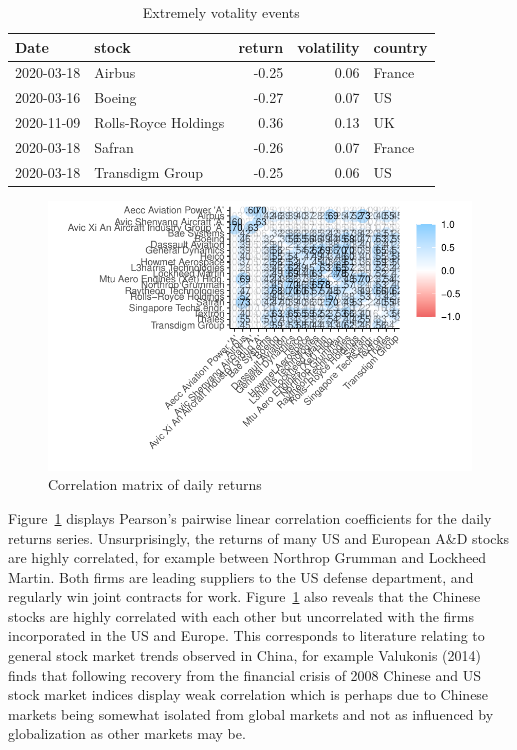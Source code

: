 \documentclass[
  letterpaper,
  DIV=11,
  numbers=noendperiod]{scrartcl}
\begin{document}
\hypertarget{tbl-Xtremes}{}
\begin{table}[H]
\caption{\label{tbl-Xtremes}Extremely votality events }\tabularnewline

\centering
\begin{tabular}[t]{llrrl}
\toprule
Date & stock & return & volatility & country\\
\midrule
2020-03-18 & Airbus & -0.25 & 0.06 & France\\
2020-03-16 & Boeing & -0.27 & 0.07 & US\\
2020-11-09 & Rolls-Royce Holdings & 0.36 & 0.13 & UK\\
2020-03-18 & Safran & -0.26 & 0.07 & France\\
2020-03-18 & Transdigm Group & -0.25 & 0.06 & US\\
\bottomrule
\end{tabular}
\end{table}

\begin{figure}[H]

{\centering \includegraphics{defence_files/figure-pdf/fig-cor-1.pdf}

}

\caption{\label{fig-cor}Correlation matrix of daily returns}

\end{figure}

Figure~\ref{fig-cor} displays Pearson's pairwise linear correlation
coefficients for the daily returns series. Unsurprisingly, the returns
of many US and European A\&D stocks are highly correlated, for example
between Northrop Grumman and Lockheed Martin. Both firms are leading
suppliers to the US defense department, and regularly win joint
contracts for work. Figure~\ref{fig-cor} also reveals that the Chinese
stocks are highly correlated with each other but uncorrelated with the
firms incorporated in the US and Europe. This corresponds to literature
relating to general stock market trends observed in China, for example
Valukonis (2014) finds that following recovery from the financial crisis
of 2008 Chinese and US stock market indices display weak correlation
which is perhaps due to Chinese markets being somewhat isolated from
global markets and not as influenced by globalization as other markets
may be.
\end{document}
